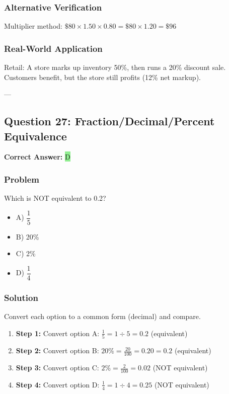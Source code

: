 \documentclass[12pt]{article}
\begin{document}
\subsubsection*{Alternative Verification}
Multiplier method: $\$80 \times 1.50 \times 0.80 = \$80 \times 1.20 = \$96$ 

\subsubsection*{Real-World Application}
Retail: A store marks up inventory 50\%, then runs a 20\% discount sale. Customers benefit, but the store still profits (12\% net markup).

---

\subsection{Question 27: Fraction/Decimal/Percent Equivalence}

\textbf{Correct Answer: } \colorbox{lightgreen}{D}

\subsubsection*{Problem}
Which is NOT equivalent to 0.2?
\begin{itemize}
\item A) $\dfrac{1}{5}$
\item B) 20\%
\item C) 2\%
\item D) $\dfrac{1}{4}$
\end{itemize}

\subsubsection*{Solution}

Convert each option to a common form (decimal) and compare.

\begin{enumerate}
\item \textbf{Step 1:} Convert option A: $\frac{1}{5} = 1 \div 5 = 0.2$  (equivalent)
\item \textbf{Step 2:} Convert option B: $20\% = \frac{20}{100} = 0.20 = 0.2$  (equivalent)
\item \textbf{Step 3:} Convert option C: $2\% = \frac{2}{100} = 0.02$  (NOT equivalent)
\item \textbf{Step 4:} Convert option D: $\frac{1}{4} = 1 \div 4 = 0.25$  (NOT equivalent)
\end{enumerate}
\end{document}
